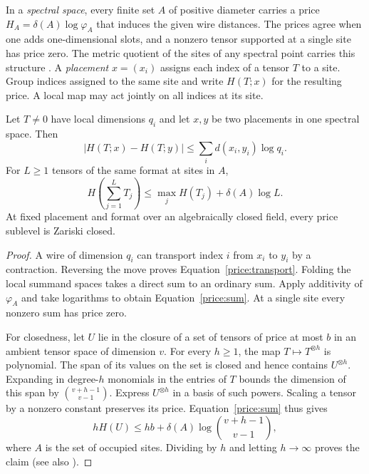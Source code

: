 In a \emph{spectral space}, every finite set $A$ of positive diameter
carries a price $H_A=\delta(A)\log\varphi_A$ that induces the given
wire distances. The prices agree when one adds one-dimensional slots,
and a nonzero tensor supported at a single site has price zero. The
metric quotient of the sites of any spectral point carries this
structure \cite[Section~]{oaG}. A \emph{placement}
$x=(x_i)$ assigns each index of a tensor $T$ to a site. Group indices
assigned to the same site and write $H(T;x)$ for the resulting price.
A local map may act jointly on all indices at its site.

\par{}
\begin{lemma}\label{price:rules}
Let $T\ne0$ have local dimensions $q_i$ and let $x,y$ be two placements
in one spectral space. Then
\begin{equation}\label{price:transport}
   |H(T;x)-H(T;y)|\leq\sum_i d(x_i,y_i)\log q_i .
\end{equation}
For $L\ge1$ tensors of the same format at sites in $A$,
\begin{equation}\label{price:sum}
    H\left(\sum_{j=1}^L T_j\right)
       \leq\max_j H(T_j)+\delta(A)\log L.
\end{equation}
At fixed placement and format over an algebraically closed field, every
price sublevel is Zariski closed.
\end{lemma}

\begin{proof}
A wire of dimension $q_i$ can transport index $i$ from $x_i$ to $y_i$
by a contraction. Reversing the move proves Equation~\eqref{price:transport}.
Folding the local summand spaces takes a direct sum to an ordinary
sum. Apply additivity of $\varphi_A$ and take logarithms to obtain
Equation~\eqref{price:sum}. At a single site every nonzero sum has
price zero.

For closedness, let $U$ lie in the closure of a set of tensors of
price at most $b$ in an ambient tensor space of dimension $v$.
For every $h\ge1$, the map $T\mapsto T^{\otimes h}$ is polynomial.
The span of its values on the set is closed and hence contains
$U^{\otimes h}$. Expanding in degree-$h$ monomials in the entries
of $T$ bounds the dimension of this span by
$\binom{v+h-1}{v-1}$. Express $U^{\otimes h}$ in a basis of such
powers. Scaling a tensor by a nonzero constant preserves its price.
Equation~\eqref{price:sum} thus gives
\[
 hH(U)\le hb+\delta(A)\log\binom{v+h-1}{v-1},
\]
where $A$ is the set of occupied sites. Dividing by $h$ and letting
$h\to\infty$ proves the claim
\cite[Lemma~]{oaG}
(see also \cite{SpectralSublevels}).
\end{proof}

